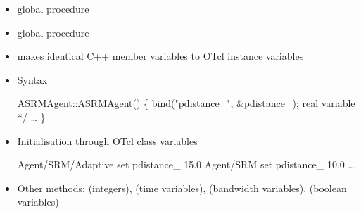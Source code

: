 \documentclass[landscape]{foils}
\begin{document}
\begin{itemize}
\item global procedure 


\item global procedure 
\end{itemize}

\begin{comment}
\item \verb|\placefig{tclobject-mech}|
\item handle and handle equivalence
\item constructor calling sequence: self next
\item Base class constructr creates shadow...common mistake
\item caveat regarding OTcl constructors
\item create-shadow
\item command method
\end{comment}

\begin{itemize}
\item makes identical C++ member variables to OTcl instance variables
\item Syntax
  \begin{program}
    ASRMAgent::ASRMAgent() \{
      bind("pdistance_", &pdistance_);      \* real variable */
      \ldots
    \}
  \end{program}
\item Initialisation through OTcl class variables
  \begin{program}
      Agent/SRM/Adaptive set pdistance_ 15.0
      Agent/SRM set pdistance_ 10.0
      \ldots
  \end{program}
\item Other methods:  (integers),
   (time variables),
   (bandwidth variables),
   (boolean variables)
\end{itemize}

\begin{comment}
\item Five different data types supported.
\item Usage syntax supports obvious normal forms
\item identicality of data
\end{comment}
\end{document}
